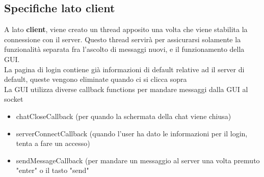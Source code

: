 \documentclass[12pt]{article}
\begin{document}
\subsection{Specifiche lato client}
A lato \textbf{client}, viene creato un thread apposito una volta che viene stabilita la  connessione con il server. Questo thread servirà per assicurarsi solamente la funzionalità separata fra l'ascolto di messaggi nuovi, e il funzionamento della GUI.
\\
La pagina di login contiene già informazioni di default relative ad il server di default, queste vengono eliminate quando ci si clicca sopra
\\
La GUI utilizza diverse callback functions per mandare messaggi dalla GUI al socket
\begin{itemize}
    \item chatCloseCallback (per quando la schermata della chat viene chiusa)
    \item serverConnectCallback (quando l'user ha dato le informazioni per il login, tenta a fare un accesso)
    \item sendMessageCallback (per mandare un messaggio al server una volta premuto "enter" o il tasto "send"
\end{itemize}
\end{document}
